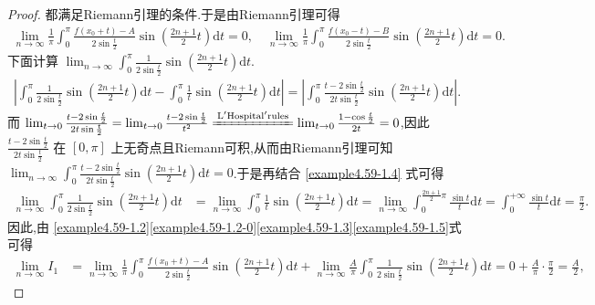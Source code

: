 \documentclass[../../main.tex]{subfiles}
\begin{document}
\begin{proof}
都满足Riemann引理的条件.于是由Riemann引理可得
\begin{align}\label{example4.59-1.3}
\lim_{n\rightarrow \infty} \frac{1}{\pi}\int_0^{\pi}{\frac{f(x_0 + t) - A}{2\sin \frac{t}{2}}\sin \left( \frac{2n + 1}{2}t \right) \mathrm{d}t}=0, \quad \lim_{n\rightarrow \infty} \frac{1}{\pi}\int_0^{\pi}{\frac{f(x_0 - t) - B}{2\sin \frac{t}{2}}\sin \left( \frac{2n + 1}{2}t \right) \mathrm{d}t}=0.
\end{align}
下面计算 \(\lim_{n\rightarrow \infty} \int_0^{\pi}{\frac{1}{2\sin \frac{t}{2}}\sin \left( \frac{2n + 1}{2}t \right) \mathrm{d}t}\).
\begin{align}\label{example4.59-1.4}
\left| \int_0^{\pi}{\frac{1}{2\sin \frac{t}{2}}\sin \left( \frac{2n + 1}{2}t \right) \mathrm{d}t}-\int_0^{\pi}{\frac{1}{t}\sin \left( \frac{2n + 1}{2}t \right) \mathrm{d}t} \right|=\left| \int_0^{\pi}{\frac{t - 2\sin \frac{t}{2}}{2t\sin \frac{t}{2}}\sin \left( \frac{2n + 1}{2}t \right) \mathrm{d}t} \right|.
\end{align}
而 \(\lim_{t\rightarrow 0} \frac{t - 2\sin \frac{t}{2}}{2t\sin \frac{t}{2}}=\lim_{t\rightarrow 0} \frac{t - 2\sin \frac{t}{2}}{t^2}\xlongequal{\mathrm{L}'\mathrm{Hospital}'\mathrm{rules}}\lim_{t\rightarrow 0} \frac{1 - \cos \frac{t}{2}}{2t}=0\),因此 \(\frac{t - 2\sin \frac{t}{2}}{2t\sin \frac{t}{2}}\) 在 \([0, \pi]\) 上无奇点且Riemann可积,从而由Riemann引理可知 \(\lim_{n\rightarrow \infty} \int_0^{\pi}{\frac{t - 2\sin \frac{t}{2}}{2t\sin \frac{t}{2}}\sin \left( \frac{2n + 1}{2}t \right) \mathrm{d}t}=0\).于是再结合 \eqref{example4.59-1.4} 式可得
\begin{align}\label{example4.59-1.5}
\lim_{n\rightarrow \infty} \int_0^{\pi}{\frac{1}{2\sin \frac{t}{2}}\sin \left( \frac{2n + 1}{2}t \right) \mathrm{d}t}&=\lim_{n\rightarrow \infty} \int_0^{\pi}{\frac{1}{t}\sin \left( \frac{2n + 1}{2}t \right) \mathrm{d}t}
=\lim_{n\rightarrow \infty} \int_0^{\frac{2n + 1}{2}\pi}{\frac{\sin t}{t}\mathrm{d}t}
=\int_0^{+\infty}{\frac{\sin t}{t}\mathrm{d}t}=\frac{\pi}{2}.
\end{align}
因此,由 \eqref{example4.59-1.2}\eqref{example4.59-1.2-0}\eqref{example4.59-1.3}\eqref{example4.59-1.5}式可得
\begin{align*}
\lim_{n\rightarrow \infty} I_1&=\lim_{n\rightarrow \infty} \frac{1}{\pi}\int_0^{\pi}{\frac{f(x_0 + t) - A}{2\sin \frac{t}{2}}\sin \left( \frac{2n + 1}{2}t \right) \mathrm{d}t}+\lim_{n\rightarrow \infty} \frac{A}{\pi}\int_0^{\pi}{\frac{1}{2\sin \frac{t}{2}}\sin \left( \frac{2n + 1}{2}t \right) \mathrm{d}t}
=0 + \frac{A}{\pi}\cdot \frac{\pi}{2}
=\frac{A}{2},
\end{align*}


\end{proof}
\end{document}
